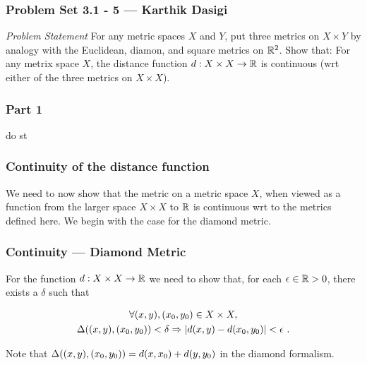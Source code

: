
\begin{frame}
    \frametitle{Problem Set 3.1 - 5 --- Karthik Dasigi}
    \emph{Problem Statement}
    For any metric spaces \(X\) and \(Y\), put three metrics on \(X \times Y\)
    by analogy with the Euclidean, diamon, and square metrics on \(\mathbb{R}^2\).
    Show that: For any metrix space \(X\), the distance function \(d: X \times X
    \to \mathbb{R}\) is continuous (wrt either of the three metrics on \(X \times
    X\)).
\end{frame}

\begin{frame}
    \frametitle{Part 1}

    do st

\end{frame}

\begin{frame}
    \frametitle{Continuity of the distance function}

    We need to now show that the metric on a metric space \(X\), when viewed as
    a function from the larger space \(X\times X\) to \(\mathbb{R}\) is continuous
    wrt to the metrics defined here. \pause We begin with the case for the
    diamond metric.

\end{frame}

\begin{frame}
    \frametitle{Continuity --- Diamond Metric}

    For the function \(d: X\times X \to \mathbb{R}\) we need to show that, for each
    \(\epsilon \in \mathbb{R} > 0\), there exists a \(\delta\) such that 

    \begin{gather}
        \forall (x, y), (x_0, y_0) \in X\times X,\nonumber\\
        \Delta((x, y), (x_0, y_0)) < \delta \Rightarrow |d(x, y) - d(x_0, y_0)| < \epsilon~.
    \end{gather}

    Note that \(\Delta((x, y), (x_0, y_0)) = d(x, x_0) + d(y, y_0)\)
    in the diamond formalism.

    
\end{frame}

